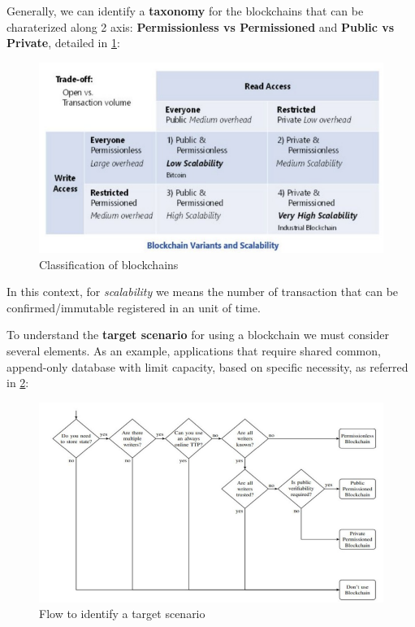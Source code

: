 \documentclass[10pt,a4paper]{report}
\begin{document}
Generally, we can identify a \textbf{taxonomy} for the blockchains that can be charaterized along 2 axis: \textbf{Permissionless vs Permissioned} and \textbf{Public vs Private}, detailed in \ref{fig:taxonomy}:
\begin{figure}
	\centering
	\includegraphics[scale=0.70]{images/Pasted image 20230224142730.png}
	\caption{Classification of blockchains}
	\label{fig:taxonomy}
\end{figure}

In this context, for \textit{scalability} we means the number of transaction that can be confirmed/immutable registered in an unit of time.

To understand the \textbf{target scenario} for using a blockchain we must consider several elements. As an example, applications that require shared common, append-only database with limit capacity, based on specific necessity, as referred in \ref{diagram1}:
\begin{figure}
	\centering
	\includegraphics[scale=0.60]{images/Pasted image 20230224144251.png}
	\caption{Flow to identify a target scenario}
	\label{diagram1}
\end{figure}
\end{document}
